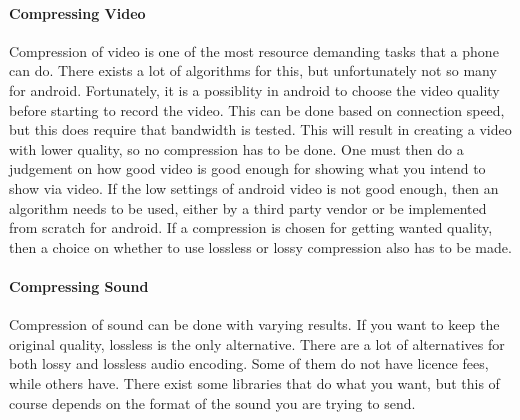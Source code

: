 \newpage

\paragraph{Compressing Video} \hfill
\newline
Compression of video is one of the most resource demanding tasks that a phone can do. There exists a lot of algorithms for this, but unfortunately not so many for android. Fortunately, it is a possiblity in android to choose the video quality before starting to record the video. This can be done based on connection speed, but this does require that bandwidth is tested. This will result in creating a video with lower quality, so no compression has to be done. One must then do a judgement on how good video is good enough for showing what you intend to show via video. If the low settings of android video is not good enough, then an algorithm needs to be used, either by a third party vendor or be implemented from scratch for android. If a compression is chosen for getting wanted quality, then a choice on whether to use lossless or lossy compression also has to be made.

\paragraph{Compressing Sound}\hfill
\newline
Compression of sound can be done with varying results. If you want to keep the original quality, lossless is the only alternative. There are a lot of alternatives for both lossy and lossless audio encoding. Some of them do not have licence fees, while others have. There exist some libraries that do what you want, but this of course depends on the format of the sound you are trying to send.








